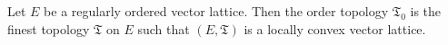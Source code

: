 Let $E$ be a regularly ordered vector lattice. Then the order topology $\mathfrak{T}_0$ is the finest topology $\mathfrak{T}$ on $E$ such that $(E, \mathfrak{T})$ is a locally convex vector lattice.
